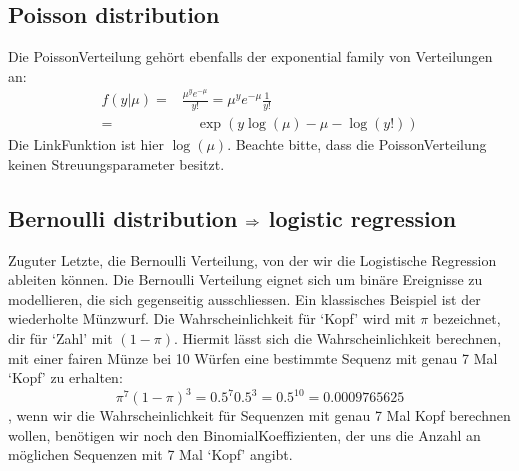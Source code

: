 \documentclass[letterpaper,10pt,english]{jupyterBook}
\begin{document}
\subsection{Poisson distribution}
\label{\detokenize{Regression_Techniques:poisson-distribution}}
\sphinxAtStartPar
Die Poisson\sphinxhyphen{}Verteilung gehört ebenfalls der exponential family von Verteilungen an:
\begin{eqnarray*}
f(y| \mu) =& \frac{\mu^{y} e^{-\mu}}{y!} = \mu^y e^{-\mu}\frac{1}{y!}\\
=& \quad\exp\left(y \log(\mu) - \mu - \log(y!)\right)
\end{eqnarray*}
\sphinxAtStartPar
Die Link\sphinxhyphen{}Funktion ist hier \(\log(\mu)\). Beachte bitte, dass die Poisson\sphinxhyphen{}Verteilung keinen Streuungsparameter besitzt.


\subsection{Bernoulli distribution \protect\(\Rightarrow\protect\) logistic regression}
\label{\detokenize{Regression_Techniques:bernoulli-distribution-rightarrow-logistic-regression}}
\sphinxAtStartPar
Zuguter Letzte, die Bernoulli Verteilung, von der wir die Logistische Regression ableiten können.
Die Bernoulli Verteilung eignet sich um binäre Ereignisse zu modellieren, die sich gegenseitig ausschliessen. Ein klassisches Beispiel ist der wiederholte Münzwurf. Die Wahrscheinlichkeit für ‘Kopf’ wird mit \(\pi\) bezeichnet, dir für ‘Zahl’ mit \((1-\pi)\). Hiermit lässt sich die Wahrscheinlichkeit berechnen, mit einer fairen Münze bei 10 Würfen eine bestimmte Sequenz mit genau 7 Mal ‘Kopf’ zu erhalten:
\label{equation:Regression_Techniques:f1356535-f83c-4660-9465-9207a7ace703}\begin{equation}
\pi^7 (1-\pi)^3 = 0.5^7 0.5^3 = 0.5^{10} = 0.0009765625
\end{equation}
\sphinxAtStartPar
{}, wenn wir die Wahrscheinlichkeit für Sequenzen mit genau 7 Mal Kopf berechnen wollen, benötigen wir noch den Binomial\sphinxhyphen{}Koeffizienten, der uns die Anzahl an möglichen Sequenzen mit 7 Mal ‘Kopf’ angibt.
\end{document}
